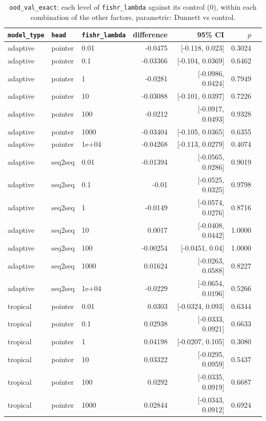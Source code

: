 \documentclass[10pt]{article}
\begin{document}
{\small
\begin{longtable}{lllrrrl}
\caption{\texttt{ood\_val\_exact}: each level of \texttt{fishr\_lambda} against its control (0), within each combination of the other factors. parametric: Dunnett vs control.}\label{tab:control-ood_val_exact}\\
\toprule
\texttt{model\_type} & \texttt{head} & \texttt{fishr\_lambda} & difference & 95\% CI & $p$ & \\
\midrule
\endhead
adaptive & pointer & 0.01 & -0.0475 & [-0.118, 0.023] & 0.3024 & \\
adaptive & pointer & 0.1 & -0.03366 & [-0.104, 0.0369] & 0.6462 & \\
adaptive & pointer & 1 & -0.0281 & [-0.0986, 0.0424] & 0.7949 & \\
adaptive & pointer & 10 & -0.03088 & [-0.101, 0.0397] & 0.7226 & \\
adaptive & pointer & 100 & -0.0212 & [-0.0917, 0.0493] & 0.9328 & \\
adaptive & pointer & 1000 & -0.03404 & [-0.105, 0.0365] & 0.6355 & \\
adaptive & pointer & 1e+04 & -0.04268 & [-0.113, 0.0279] & 0.4074 & \\
adaptive & seq2seq & 0.01 & -0.01394 & [-0.0565, 0.0286] & 0.9019 & \\
adaptive & seq2seq & 0.1 & -0.01 & [-0.0525, 0.0325] & 0.9798 & \\
adaptive & seq2seq & 1 & -0.0149 & [-0.0574, 0.0276] & 0.8716 & \\
adaptive & seq2seq & 10 & 0.0017 & [-0.0408, 0.0442] & 1.0000 & \\
adaptive & seq2seq & 100 & -0.00254 & [-0.0451, 0.04] & 1.0000 & \\
adaptive & seq2seq & 1000 & 0.01624 & [-0.0263, 0.0588] & 0.8227 & \\
adaptive & seq2seq & 1e+04 & -0.0229 & [-0.0654, 0.0196] & 0.5266 & \\
tropical & pointer & 0.01 & 0.0303 & [-0.0324, 0.093] & 0.6344 & \\
tropical & pointer & 0.1 & 0.02938 & [-0.0333, 0.0921] & 0.6633 & \\
tropical & pointer & 1 & 0.04198 & [-0.0207, 0.105] & 0.3080 & \\
tropical & pointer & 10 & 0.03322 & [-0.0295, 0.0959] & 0.5437 & \\
tropical & pointer & 100 & 0.0292 & [-0.0335, 0.0919] & 0.6687 & \\
tropical & pointer & 1000 & 0.02844 & [-0.0343, 0.0912] & 0.6924 & \\

\end{longtable}}
\end{document}
